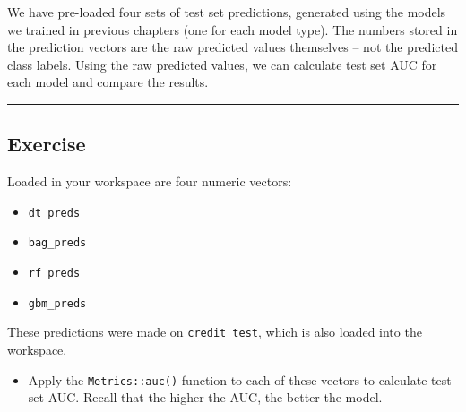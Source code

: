\documentclass[
]{book}
\newenvironment{Shaded}{\begin{snugshade}}{\end{snugshade}}
\newcommand{\CommentTok}[1]{\textcolor[rgb]{0.56,0.35,0.01}{\textit{#1}}}
\newcommand{\DataTypeTok}[1]{\textcolor[rgb]{0.13,0.29,0.53}{#1}}
\newcommand{\KeywordTok}[1]{\textcolor[rgb]{0.13,0.29,0.53}{\textbf{#1}}}
\newcommand{\NormalTok}[1]{#1}
\newcommand{\OperatorTok}[1]{\textcolor[rgb]{0.81,0.36,0.00}{\textbf{#1}}}
\newcommand{\StringTok}[1]{\textcolor[rgb]{0.31,0.60,0.02}{#1}}
\providecommand{\tightlist}{%
  \setlength{\itemsep}{0pt}\setlength{\parskip}{0pt}}
\begin{document}
We have pre-loaded four sets of test set predictions, generated using the models we trained in previous chapters (one for each model type). The numbers stored in the prediction vectors are the raw predicted values themselves -- not the predicted class labels. Using the raw predicted values, we can calculate test set AUC for each model and compare the results.

\begin{center}\rule{0.5\linewidth}{0.5pt}\end{center}

\hypertarget{exercise-27}{%
\subsection*{Exercise}\label{exercise-27}}

Loaded in your workspace are four numeric vectors:

\begin{itemize}
\tightlist
\item
  \texttt{dt\_preds}
\item
  \texttt{bag\_preds}
\item
  \texttt{rf\_preds}
\item
  \texttt{gbm\_preds}
\end{itemize}

These predictions were made on \texttt{credit\_test}, which is also loaded into the workspace.

\begin{itemize}
\tightlist
\item
  Apply the \texttt{Metrics::auc()} function to each of these vectors to calculate test set AUC. Recall that the higher the AUC, the better the model.
\end{itemize}

\begin{Shaded}
\end{Shaded}
\end{document}
